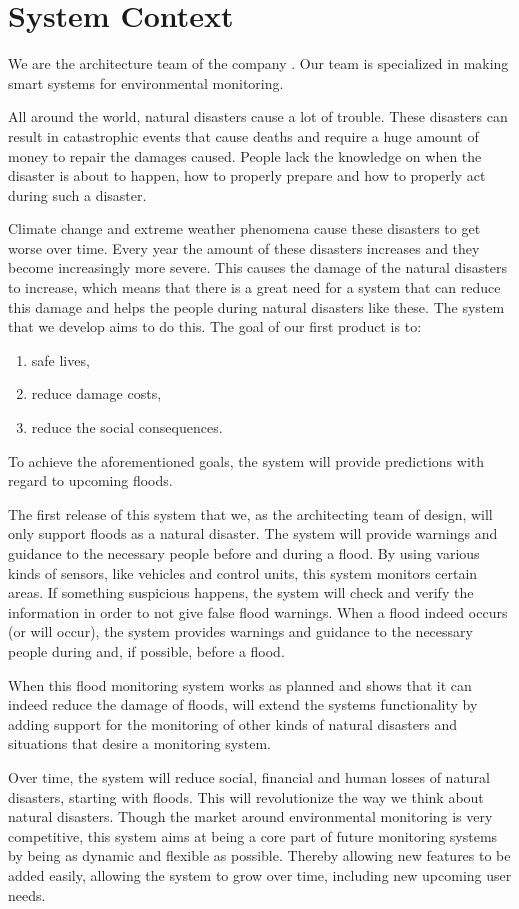 \chapter{System Context}
\label{ch:context}

We are the architecture team of the company \CompanyName. Our team is specialized in making smart systems for environmental monitoring.

All around the world, natural disasters cause a lot of trouble. These disasters can result in catastrophic events that cause deaths and require a huge amount of money to repair the damages caused. People lack the knowledge on when the disaster is about to happen, how to properly prepare and how to properly act during such a disaster.

Climate change and extreme weather phenomena cause these disasters to get worse over time. Every year the amount of these disasters increases and they become increasingly more severe. This causes the damage of the natural disasters to increase, which means that there is a great need for a system that can reduce this damage and helps the people during natural disasters like these. The system that we develop aims to do this.
The goal of our first product is to:
\begin{enumerate}
  \item safe lives,
  \item reduce damage costs,
  \item reduce the social consequences.
\end{enumerate}

To achieve the aforementioned goals, the system will provide predictions with regard to upcoming floods.

The first release of this system that we, as the architecting team of \CompanyName design, will only support floods as a natural disaster. The system will provide warnings and guidance to the necessary people before and during a flood. By using various kinds of sensors, like vehicles and control units, this system monitors certain areas. If something suspicious happens, the system will check and verify the information in order to not give false flood warnings. When a flood indeed occurs (or will occur), the system   provides warnings and guidance to the necessary people during and, if possible, before a flood. 

When this flood monitoring system works as planned and shows that it can indeed reduce the damage of floods, \CompanyName will extend the systems functionality  by adding support for the monitoring of other kinds of natural disasters and situations that desire a monitoring system.

Over time, the system will reduce social, financial and human losses of natural disasters, starting with floods. This will revolutionize the way we think about natural disasters. Though the market around environmental monitoring is very competitive, this system aims at being a core part of future monitoring systems by being as dynamic and flexible as possible. Thereby allowing new features to be added easily, allowing the system to grow over time, including new upcoming user needs.